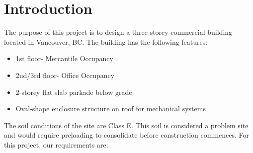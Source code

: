 \documentclass[12pt]{article}
\begin{document}
\section{Introduction}
The purpose of this project is to design a three-storey commercial building located in Vancouver, BC.
The building has the following features:
\begin{itemize}
    \item 1st floor- Mercantile Occupancy
    \item 2nd/3rd floor- Office Occupancy
    \item 2-storey flat slab parkade below grade
    \item Oval-shape enclosure structure on roof for mechanical systems
\end{itemize}
The soil conditions of the site are Class E.
This soil is considered a problem site and would require preloading to consolidate before construction commences.
For this project, our requirements are:
\end{document}
